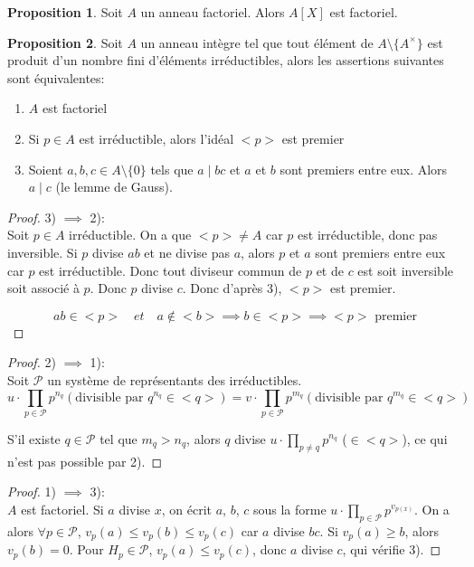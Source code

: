\documentclass{article}
\theoremstyle{definition}
\theoremstyle{definition}
\newtheorem{prop}{Proposition}
\theoremstyle{definition}
\theoremstyle{plain}
\theoremstyle{theorem}
\begin{document}
\begin{prop}
	Soit $A$ un anneau factoriel. Alors $A[X]$ est factoriel.
\end{prop}


\begin{prop}
	Soit $A$ un anneau intègre tel que tout élément de $A\setminus\{A^{\times}\}$ est produit d'un nombre fini d'éléments irréductibles, alors les assertions suivantes sont équivalentes:
	\begin{enumerate}
		\item $A$ est factoriel
		\item Si $p \in A$ est irréductible, alors l'idéal $<p>$ est premier
		\item Soient $a,b,c \in A\setminus\{0\}$ tels que $a \mid bc$ et $a$ et $b$ sont premiers entre eux. Alors $a \mid c$ (le lemme de Gauss).
	\end{enumerate}
\end{prop}

\begin{proof}

	3) $\implies$ 2):\\
	Soit $p \in A$ irréductible. On a que $<p> \neq A$ car $p$ est irréductible, donc pas inversible.
	Si $p$ divise $ab$ et ne divise pas $a$, alors $p$ et $a$ sont premiers entre eux car $p$ est irréductible.
	Donc tout diviseur commun de $p$ et de $c$ est soit inversible soit associé à $p$. Donc $p$ divise $c$.
	Donc d'après 3), $<p>$ est premier.

	\[ ab \in <p>\quad  et \quad a \notin <b> \implies b \in <p> \implies <p> \text{ premier} \]

\end{proof}

\begin{proof}

	2) $\implies$ 1):\\
	Soit $\mathcal{P}$ un système de représentants des irréductibles.
	\begin{equation*}
		u \cdot \prod_{p \in \mathcal{P}} p^{n_q} (\text{divisible par } q^{n_q} \in <q> ) = v \cdot \prod_{p \in \mathcal{P}} p^{m_q} (\text{divisible par } q^{m_q} \in <q>)
	\end{equation*}
	\noindent

	S'il existe $q \in \mathcal{P}$ tel que $m_q > n_q$, alors $q$ divise $u \cdot \prod_{p \ne q} p^{n_q}$ ($\in <q>$), ce qui n'est pas possible par 2).

\end{proof}

\begin{proof}

	1) $\implies$ 3):\\
	$A$ est factoriel. Si $a$  divise $x$, on écrit $a$, $b$, $c$ sous la forme $u \cdot \prod_{p \in \mathcal{P}} p^{v_{p(x)}}$.
	On a alors $\forall p \in \mathcal{P}$, $v_p(a) \leqslant v_p(b) \leqslant v_p(c)$ car $a$ divise $bc$.
	Si $v_p(a) \geqslant b$, alors $v_p(b) = 0$.
	Pour $H_p \in \mathcal{P}$, $v_p(a) \leqslant v_p(c)$, donc $a$ divise $c$, qui vérifie 3).

\end{proof}
\end{document}
